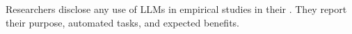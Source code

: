 Researchers \must disclose any use of LLMs in empirical studies in their \paper. They \should report their purpose, automated tasks, and expected benefits.